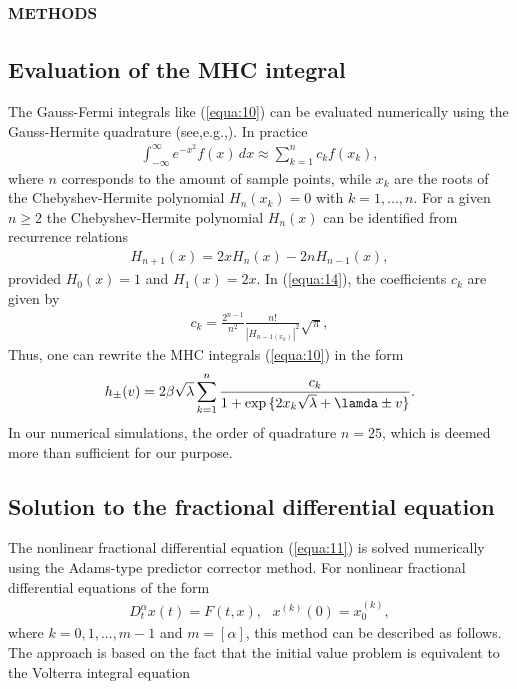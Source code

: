 \documentclass[10pt]{article}
\begin{document}
\begin{multicols}{2}
{\section{\scshape methods}
}
{\centering \subsection{Evaluation of the MHC integral}}
The Gauss-Fermi integrals like (\ref{equa:10}) can be evaluated numerically using the Gauss-Hermite quadrature (see,e.g.,). In practice
\begin{align}
    \int_{- \infty}^\infty e^{-x^2} f(x) \,dx \approx \sum_{k=1}^n c_k f(x_k), \label{equa:14}
\end{align}
where $n$ corresponds to the amount of sample points, while $x_k$ are the roots of the Chebyshev-Hermite polynomial $H_n (x_k) = 0$ with $k=1,...,n$. For a given $n \ge 2$ the Chebyshev-Hermite polynomial $H_n (x)$ can be identified from recurrence relations
\begin{align}
    H_{n+1}(x) = 2xH_n(x) - 2nH_{n-1}(x), \label{equa:15}
\end{align}
provided $H_0(x)=1$ and $H_1(x) = 2x$. In (\ref{equa:14}), the coefficients $c_k$ are given by
\begin{align}
    c_k = \frac{2^{n-1}}{n^2} \frac{n!}{|H_{n-1 (x_k)}|^2} \sqrt{\pi}, \label{equa:16}
\end{align}
Thus, one can rewrite the MHC integrals (\ref{equa:10}) in the form
\begin{align}
    h_{\pm}(v)=2 \beta \sqrt{\lambda} \sum_{k=1}^n \frac{c_k}{1+\exp{\{2x_k \sqrt{\lambda} + \lamda \pm v\}}}. \label{equa:17}
\end{align}
In our numerical simulations, the order of quadrature $n = 25$, which is deemed more than sufficient for our purpose.
\par
{\centering \subsection{Solution to the fractional differential equation}}
The nonlinear fractional differential equation (\ref{equa:11}) is solved numerically using the Adams-type predictor corrector method. For nonlinear fractional differential equations of the form
\begin{align}
    D_t^\alpha x(t) = F(t,x), ~~~ x^{(k)}(0) = x_0^{(k)}, \label{equa:18}
\end{align}
where $k = 0, 1, . . . , m - 1$ and $m = [\alpha]$, this method can be described as follows. The approach is based on the fact that the initial value problem is equivalent to the Volterra integral equation

\end{multicols}
\end{document}
